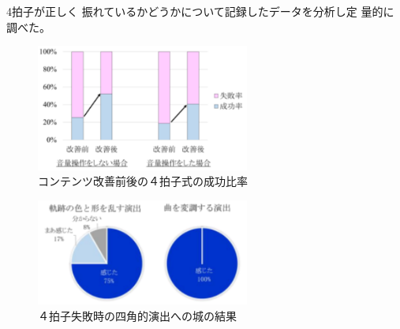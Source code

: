 \documentclass[uplatex]{jsarticle}   %
\begin{document}
4拍子が正しく 振れているかどうかについて記録したデータを分析し定 量的に調べた。

\begin{figure}[H]
 \centering
 \includegraphics[clip,width=7cm]{sippairitu.png}
 \caption{コンテンツ改善前後の４拍子式の成功比率}\label{fig:hoge}
\end{figure}

\begin{figure}[H]
 \centering
 \includegraphics[clip,width=7cm]{miss.png}
 \caption{４拍子失敗時の四角的演出への城の結果}\label{fig:hoge}
\end{figure}




\end{document}
